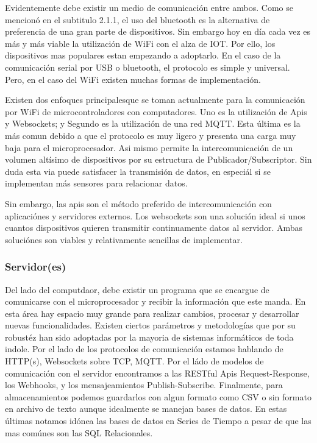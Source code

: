 Evidentemente debe existir un medio de comunicación entre ambos. Como se mencionó en el subtitulo 2.1.1, el uso del bluetooth es la alternativa de preferencia de una gran parte de dispositivos. Sin embargo hoy en día cada vez es más y más viable la utilización de WiFi con el alza de IOT. Por ello, los dispositivos mas populares estan empezando a adoptarlo. En el caso de la comunicación serial por USB o bluetooth, el protocolo es simple y universal. Pero, en el caso del WiFi existen muchas formas de implementación.

Existen dos enfoques principalesque se toman actualmente para la comunicación por WiFi de microcontroladores con computadores. Uno es la utilización de Apis y Websockets; y Segundo es la utilización de una red MQTT. Esta última es la más comun debido a que el protocolo es muy ligero y presenta una carga muy baja para el microprocesador. Asi mismo permite la intercomunicación de un volumen altísimo de dispositivos por su estructura de Publicador/Subscriptor. Sin duda esta via puede satisfacer la transmisión de datos, en especiál si se implementan más sensores para relacionar datos.

Sin embargo, las apis son el método preferido de intercomunicación con aplicaciónes y servidores externos. Los websockets son una solución ideal si unos cuantos dispositivos quieren transmitir continuamente datos al servidor. Ambas soluciónes son viables y relativamente sencillas de implementar.

\subsubsection{Servidor(es)}
\label{sec:orgda59ee0}
Del lado del computdaor, debe existir un programa que se encargue de comunicarse con el microprocesador y recibir la información que este manda. En esta área hay espacio muy grande para realizar cambios, procesar y desarrollar nuevas funcionalidades. Existen ciertos parámetros y metodologías que por su robustéz han sido adoptadas por la mayoria de sistemas informáticos de toda indole. Por el lado de los protocolos de comunicación estamos hablando de HTTP(s), Websockets sobre TCP, MQTT. Por el ládo de modelos de comunicación con el servidor encontramos a las RESTful Apis Request-Response, los Webhooks, y los mensajeamientos Publish-Subscribe. Finalmente, para almacenamientos podemos guardarlos con algun formato como CSV o sin formato en archivo de texto aunque idealmente se manejan bases de datos. En estas últimas notamos idónea las bases de datos en Series de Tiempo a pesar de que las mas comúnes son las SQL Relacionales.


